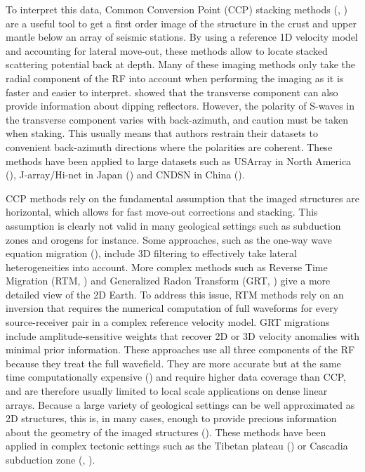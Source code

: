\documentclass[10pt,a4paper]{article}
\numberwithin{equation}{section}
\DeclareRobustCommand{\rq}[1]{{\sethlcolor{myblue}\hl{#1}}}
\begin{document}
To interpret this data, Common Conversion Point (CCP) stacking methods (\cite{tess_gpro_88}, \cite{duek_jgr_97}) are a useful tool to get a first order image of the structure in the crust and upper mantle below an array of seismic stations.
By using a reference 1D velocity model and accounting for lateral move-out, these methods allow to locate stacked scattering potential back at depth.
Many of these imaging methods only take the radial component of the RF into account when performing the imaging as it is faster and easier to interpret.
\cite{tone_epsl_08} showed that the transverse component can also provide information about dipping reflectors.
However, the polarity of S-waves in the transverse component varies with back-azimuth, and caution must be taken when staking.
This usually means that authors restrain their datasets to convenient back-azimuth directions where the polarities are coherent.
These methods have been applied to large datasets such as USArray in North America (\cite{leva_ggg_12}), J-array/Hi-net in Japan (\cite{yama_eps_03}) and CNDSN in China (\cite{chen_jgr_10}).

CCP methods rely on the fundamental assumption that the imaged structures are horizontal, which allows for fast move-out corrections and stacking.
This assumption is clearly not valid in many geological settings such as subduction zones and orogens for instance.
Some approaches, such as the one-way wave equation migration (\cite{chen_jgr_05}), include 3D filtering to effectively take lateral heterogeneities into account.
More complex methods such as Reverse Time Migration (RTM, \cite{burd_gji_13}) and Generalized Radon Transform (GRT, \cite{bost_jgr_01}) give a more detailed view of the 2D Earth.
To address this issue, RTM methods rely on an inversion that requires the numerical computation of full waveforms for every source-receiver pair in a complex reference velocity model.
GRT migrations include amplitude-sensitive weights that recover 2D or 3D velocity anomalies with minimal prior information.
These approaches use all three components of the RF because they treat the full wavefield.
They are more accurate but at the same time computationally expensive (\cite{rond_sgeo_09}) and require higher data coverage than CCP, and are therefore usually limited to local scale applications on dense linear arrays.
Because a large variety of geological settings can be well approximated as 2D structures, this is, in many cases, enough to provide precious information about the geometry of the imaged structures (\cite{pear_jgr_12}).
These methods have been applied in complex tectonic settings such as the Tibetan plateau (\cite{shan_gji_17}) or Cascadia subduction zone (\cite{rond_jgr_01}, \cite{aber_geol_09}).
\end{document}
